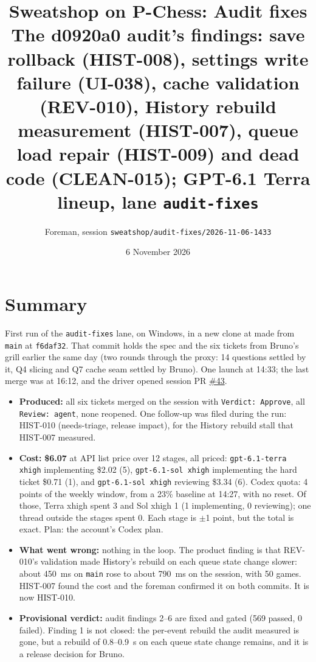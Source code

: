 \documentclass[11pt,a4paper]{article}
\title{Sweatshop on P-Chess: Audit fixes\\\large The d0920a0 audit's findings: save rollback (HIST-008), settings write failure (UI-038), cache validation (REV-010), History rebuild measurement (HIST-007), queue load repair (HIST-009) and dead code (CLEAN-015); GPT-6.1 Terra lineup, lane \texttt{audit-fixes}}
\author{Foreman, session \texttt{sweatshop/audit-fixes/2026-11-06-1433}}
\date{6 November 2026}
\begin{document}
\maketitle

\section*{Summary}

First run of the \texttt{audit-fixes} lane, on Windows, in a new clone at
 made from \texttt{main} at \texttt{f6daf32}. That commit
holds the spec and the six tickets from Bruno's grill earlier the same day (two rounds through the
proxy: 14 questions settled by it, Q4 slicing and Q7 cache seam settled by Bruno). One launch at
14:33; the last merge was at 16:12, and the driver opened session PR
\href{https://github.com/Laginho/P-Chess/pull/43}{\#43}.

\begin{itemize}
  \item \textbf{Produced:} all six tickets merged on the session with \texttt{Verdict: Approve},
        all \texttt{Review: agent}, none reopened. One follow-up was filed during the run:
        HIST-010 (needs-triage, release impact), for the History rebuild stall that HIST-007
        measured.
  \item \textbf{Cost:} \textbf{\$6.07} at API list price over 12 stages, all priced:
        \texttt{gpt-6.1-terra xhigh} implementing \$2.02 (5), \texttt{gpt-6.1-sol xhigh}
        implementing the hard ticket \$0.71 (1), and \texttt{gpt-6.1-sol xhigh} reviewing \$3.34 (6).
        Codex quota: 4 points of the weekly window, from a 23\% baseline at 14:27, with no reset. Of
        those, Terra xhigh spent 3 and Sol xhigh 1 (1 implementing, 0 reviewing); one thread outside
        the stages spent 0. Each stage is $\pm$1 point, but the total is exact. Plan: the account's
        Codex plan.
  \item \textbf{What went wrong:} nothing in the loop. The product finding is that REV-010's
        validation made History's rebuild on each queue state change slower: about 450~ms on
        \texttt{main} rose to about 790~ms on the session, with 50 games. HIST-007 found the cost and
        the foreman confirmed it on both commits. It is now HIST-010.
  \item \textbf{Provisional verdict:} audit findings 2--6 are fixed and gated (569 passed,
        0 failed). Finding 1 is not closed: the per-event rebuild the audit measured is gone, but
        a rebuild of 0.8--0.9~s on each queue state change remains, and it is a release decision
        for Bruno.
\end{itemize}
\end{document}
